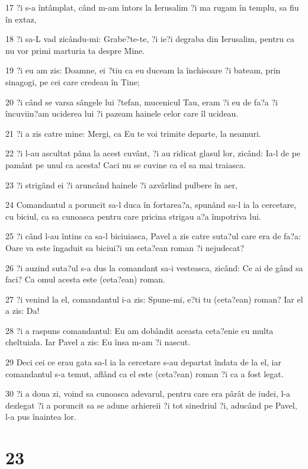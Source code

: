 \par 17 ?i s-a întâmplat, când m-am întors la Ierusalim ?i ma rugam în templu, sa fiu în extaz,
\par 18 ?i sa-L vad zicându-mi: Grabe?te-te, ?i ie?i degraba din Ierusalim, pentru ca nu vor primi marturia ta despre Mine.
\par 19 ?i eu am zis: Doamne, ei ?tiu ca eu duceam la închisoare ?i bateam, prin sinagogi, pe cei care credeau în Tine;
\par 20 ?i când se varsa sângele lui ?tefan, mucenicul Tau, eram ?i eu de fa?a ?i încuviin?am uciderea lui ?i pazeam hainele celor care îl ucideau.
\par 21 ?i a zis catre mine: Mergi, ca Eu te voi trimite departe, la neamuri.
\par 22 ?i l-au ascultat pâna la acest cuvânt, ?i au ridicat glasul lor, zicând: Ia-l de pe pamânt pe unul ca acesta! Caci nu se cuvine ca el sa mai traiasca.
\par 23 ?i strigând ei ?i aruncând hainele ?i azvârlind pulbere în aer,
\par 24 Comandantul a poruncit sa-l duca în fortarea?a, spunând sa-l ia la cercetare, cu biciul, ca sa cunoasca pentru care pricina strigau a?a împotriva lui.
\par 25 ?i când l-au întins ca sa-l biciuiasca, Pavel a zis catre suta?ul care era de fa?a: Oare va este îngaduit sa biciui?i un ceta?ean roman ?i nejudecat?
\par 26 ?i auzind suta?ul s-a dus la comandant sa-i vesteasca, zicând: Ce ai de gând sa faci? Ca omul acesta este (ceta?ean) roman.
\par 27 ?i venind la el, comandantul i-a zis: Spune-mi, e?ti tu (ceta?ean) roman? Iar el a zis: Da!
\par 28 ?i a raspuns comandantul: Eu am dobândit aceasta ceta?enie cu multa cheltuiala. Iar Pavel a zis: Eu însa m-am ?i nascut.
\par 29 Deci cei ce erau gata sa-l ia la cercetare s-au departat îndata de la el, iar comandantul s-a temut, aflând ca el este (ceta?ean) roman ?i ca a fost legat.
\par 30 ?i a doua zi, voind sa cunoasca adevarul, pentru care era pârât de iudei, l-a dezlegat ?i a poruncit sa se adune arhiereii ?i tot sinedriul ?i, aducând pe Pavel, l-a pus înaintea lor.

\chapter{23}

